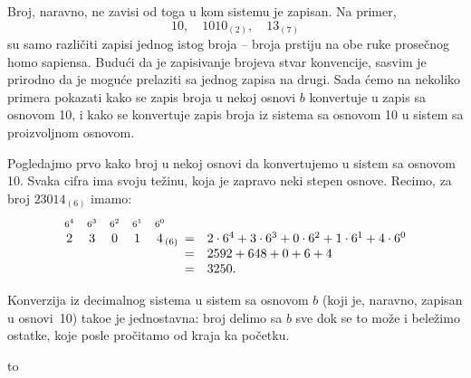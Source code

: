 \smallskip

Broj, naravno, ne zavisi od toga u kom sistemu je zapisan. Na primer,
$$
  10, \quad 1010_{(2)}, \quad 13_{(7)}
$$
su samo razli\v citi zapisi jednog istog
broja -- broja prstiju na obe ruke prose\v cnog homo sapiensa.
Budu\'ci da je zapisivanje brojeva stvar konvencije, sasvim je prirodno da
je mogu\'ce prelaziti sa jednog zapisa na drugi. Sada \'cemo na nekoliko
primera pokazati kako se zapis broja u nekoj osnovi $b$ konvertuje u
zapis sa osnovom 10, i kako se konvertuje zapis broja iz sistema sa osnovom 10
u sistem sa proizvoljnom osnovom.

Pogledajmo prvo kako broj u nekoj osnovi da konvertujemo u sistem sa
osnovom 10. Svaka cifra ima svoju te\v zinu, koja je zapravo neki
stepen osnove. Recimo, za broj $23014_{(6)}$ imamo:
$$
    \begin{array}[b]{ccccc@{}l}
        \mbox{\scriptsize$6^4$} &
        \mbox{\scriptsize$6^3$} &
        \mbox{\scriptsize$6^2$} &
        \mbox{\scriptsize$6^1$} &
        \mbox{\scriptsize$6^0$} & \\
        2 & 3 & 0 & 1 & 4&_{(6)}
    \end{array}
    \begin{array}[t]{@{}cl}
            =& 2 \cdot 6^4 + 3 \cdot 6^3 + 0 \cdot 6^2 +
               1 \cdot 6^1 + 4 \cdot 6^0\\
            =& 2592 + 648 + 0 + 6 + 4 \\
            =& 3250.
    \end{array}
$$

Konverzija iz decimalnog sistema u sistem sa osnovom $b$ (koji je, naravno, zapisan u osnovi~10) tako\dj e je
jednostavna: broj delimo sa $b$ sve dok se to mo\v ze i bele\v zimo ostatke,
koje posle pro\v citamo od kraja ka po\v cetku.

\medskip

\noindent
\hbox to 

